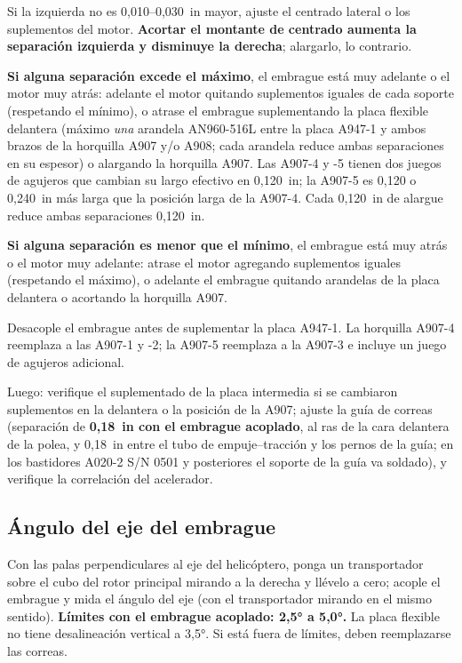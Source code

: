 Si la izquierda no es 0,010--0,030~in mayor, ajuste el centrado lateral o los suplementos del motor. \textbf{Acortar el montante de centrado aumenta la separación izquierda y disminuye la derecha}; alargarlo, lo contrario.

\textbf{Si alguna separación excede el máximo}, el embrague está muy adelante o el motor muy atrás: adelante el motor quitando suplementos iguales de cada soporte (respetando el mínimo), o atrase el embrague suplementando la placa flexible delantera (máximo \emph{una} arandela AN960-516L entre la placa A947-1 y ambos brazos de la horquilla A907 y/o A908; cada arandela reduce ambas separaciones en su espesor) o alargando la horquilla A907. Las A907-4 y -5 tienen dos juegos de agujeros que cambian su largo efectivo en 0,120~in; la A907-5 es 0,120 o 0,240~in más larga que la posición larga de la A907-4. Cada 0,120~in de alargue reduce ambas separaciones 0,120~in.

\textbf{Si alguna separación es menor que el mínimo}, el embrague está muy atrás o el motor muy adelante: atrase el motor agregando suplementos iguales (respetando el máximo), o adelante el embrague quitando arandelas de la placa delantera o acortando la horquilla A907.

\begin{precaucion}
Desacople el embrague antes de suplementar la placa A947-1. La horquilla A907-4 reemplaza a las A907-1 y -2; la A907-5 reemplaza a la A907-3 e incluye un juego de agujeros adicional.
\end{precaucion}

Luego: verifique el suplementado de la placa intermedia si se cambiaron suplementos en la delantera o la posición de la A907; ajuste la guía de correas (separación de \textbf{0,18~in con el embrague acoplado}, al ras de la cara delantera de la polea, y 0,18~in entre el tubo de empuje--tracción y los pernos de la guía; en los bastidores A020-2 S/N 0501 y posteriores el soporte de la guía va soldado), y verifique la correlación del acelerador.

\subsection{Ángulo del eje del embrague}

Con las palas perpendiculares al eje del helicóptero, ponga un transportador sobre el cubo del rotor principal mirando a la derecha y llévelo a cero; acople el embrague y mida el ángulo del eje (con el transportador mirando en el mismo sentido). \textbf{Límites con el embrague acoplado: 2,5° a 5,0°.} La placa flexible no tiene desalineación vertical a 3,5°. Si está fuera de límites, deben reemplazarse las correas.

